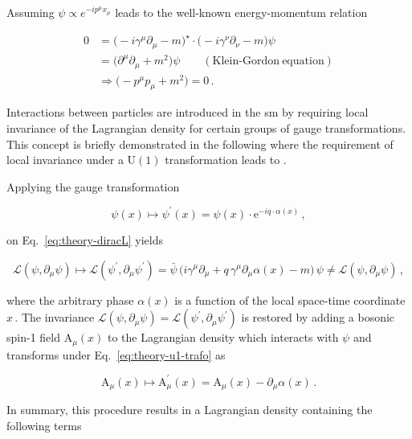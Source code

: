 Assuming $\psi\propto e^{-ip^{\mu}x_{\mu}}$ leads to the well-known energy-momentum relation

\begin{subequations}
\begin{align}
0&=\big(-i\gamma^\mu\partial_\mu-m\big)^\star\cdot \big(-i\gamma^\nu\partial_\nu-m\big)\psi\\
 &=\big(\partial^{\mu}\partial_{\mu}+m^{2}\big)\psi \qquad \mathrm{(Klein\mbox{-}Gordon~equation)}  \\
 &\Rightarrow \big(-p^{\mu}p_{\mu}+m^{2}\big) = 0\,.
\end{align}
\end{subequations}

Interactions between particles are introduced in the \gls{sm} by requiring local invariance of the Lagrangian density for certain groups of gauge transformations. This concept is briefly demonstrated in the following where the requirement of local invariance under a $\mathrm{U(1)}$ transformation leads to . 

Applying the gauge transformation

\begin{equation}
\psi(x)\mapsto\psi^{\prime}(x)=\psi(x)\cdot\mathrm{e}^{-iq\cdot\alpha(x)}\,, \label{eq:theory-u1-trafo}
\end{equation}

on Eq.~\ref{eq:theory-diracL} yields

\begin{equation}
\mathcal{L}(\psi,\partial_\mu\psi)\mapsto\mathcal{L}(\psi^{\prime},\partial_\mu\psi^{\prime})=\bar{\psi}\,\Big(i\gamma^\mu\partial_\mu+q\,\gamma^\mu\partial_\mu\alpha(x)-m\Big)\,\psi\not=\mathcal{L}(\psi,\partial_\mu\psi)\,,
\end{equation}

where the arbitrary phase $\alpha(x)$ is a function of the local space-time coordinate $x$\,. The invariance $\mathcal{L}(\psi,\partial_\mu\psi)=\mathcal{L}(\psi^{\prime},\partial_\mu\psi^{\prime})$ is restored by adding a bosonic spin-1 field $\mathrm{A}_{\mu}(x)$ to the Lagrangian density which interacts with $\psi$ and transforms under Eq.~\ref{eq:theory-u1-trafo} as

\begin{equation}
\mathrm{A}_{\mu}(x)\mapsto \mathrm{A}^{\prime}_{\mu}(x)=\mathrm{A}_\mu(x)-\partial_\mu\alpha(x)\,.
\end{equation}

In summary, this procedure results in a Lagrangian density containing the following terms

